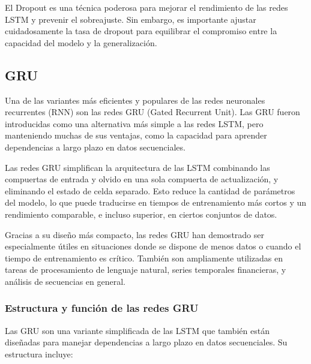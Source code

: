 \documentclass[11pt]{article}
\begin{document}
El Dropout es una técnica poderosa para mejorar el rendimiento de las
redes LSTM y prevenir el sobreajuste. Sin embargo, es importante
ajustar cuidadosamente la tasa de dropout para equilibrar el
compromiso entre la capacidad del modelo y la generalización.



\subsection{GRU}
\label{sec:orgaa97e76}


Una de las variantes más eficientes y populares de las redes neuronales recurrentes (RNN) son las redes GRU (Gated Recurrent Unit). Las GRU fueron introducidas como una alternativa más simple a las redes LSTM, pero manteniendo muchas de sus ventajas, como la capacidad para aprender dependencias a largo plazo en datos secuenciales.

Las redes GRU simplifican la arquitectura de las LSTM combinando las compuertas de entrada y olvido en una sola compuerta de actualización, y eliminando el estado de celda separado. Esto reduce la cantidad de parámetros del modelo, lo que puede traducirse en tiempos de entrenamiento más cortos y un rendimiento comparable, e incluso superior, en ciertos conjuntos de datos.

Gracias a su diseño más compacto, las redes GRU han demostrado ser especialmente útiles en situaciones donde se dispone de menos datos o cuando el tiempo de entrenamiento es crítico. También son ampliamente utilizadas en tareas de procesamiento de lenguaje natural, series temporales financieras, y análisis de secuencias en general.



\subsubsection{Estructura y función de las redes GRU}
\label{sec:orgd7cd378}
Las GRU son una variante simplificada de las LSTM que también están diseñadas para manejar dependencias a largo plazo en datos secuenciales. Su estructura incluye:
\end{document}
